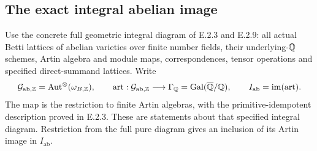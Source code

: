 \subsection{The exact integral abelian image}

Use the concrete full geometric integral diagram of E.2.3 and
E.2.9: all actual Betti lattices of abelian varieties over finite
number fields, their underlying-\(\mathbb Q\) schemes, Artin algebra
and module maps, correspondences, tensor operations and specified
direct-summand lattices. Write
\[
 \mathcal G_{\mathrm{ab},\mathbb Z}
   =\operatorname{Aut}^\otimes(\omega_{B,\mathbb Z}),\qquad
 \operatorname{art}:\mathcal G_{\mathrm{ab},\mathbb Z}\longrightarrow
       \Gamma_{\mathbb Q}=\operatorname{Gal}(\overline{\mathbb Q}/\mathbb Q),\qquad
 I_{\mathrm{ab}}=\operatorname{im}(\operatorname{art}).
\]
The map is the restriction to finite Artin algebras, with the
primitive-idempotent description proved in E.2.3.
These are statements about that specified integral diagram.
Restriction from the full pure diagram gives an inclusion of its
Artin image in \(I_{\mathrm{ab}}\).

